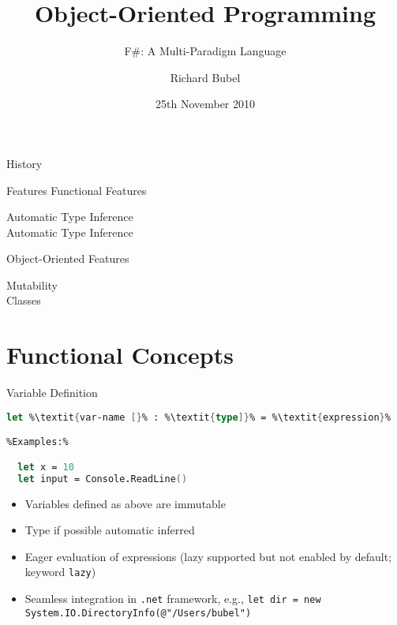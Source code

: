 \documentclass{beamer}
\title[]{Object-Oriented Programming}
\subtitle[F\#]{F\#: A Multi-Paradigm Language} %
\author[Richard Bubel] %
{Richard Bubel}
\institute[CTH]{Chalmers University of Technology}
\date{25th November 2010}%
\newcommand{\Blue}[1]{\color{blue}#1\color{black}\xspace}
\begin{document}
\begin{frame}
  \titlepage
\end{frame}

\begin{frame}{History}
\end{frame}

\begin{frame}{Features}
  \Blue{Functional Features}
  \begin{description}
    \item[Automatic Type Inference]
    \item[Automatic Type Inference]
 \end{description}
 
  \Blue{Object-Oriented Features}
  \begin{description}
    \item[Mutability]
    \item[Classes]
 \end{description}

\end{frame}

\section{Functional Concepts}

\begin{frame}[fragile]{Variable Definition}
\begin{lstlisting}[language=FSharp, escapechar=\%]
  let %\textit{var-name [}% : %\textit{type]}% = %\textit{expression}%

%Examples:%

  let x = 10
  let input = Console.ReadLine()

\end{lstlisting}
  
\begin{itemize}
\item Variables defined as above are immutable
\item Type if possible automatic inferred
\item Eager evaluation of expressions (lazy supported but not enabled
  by default; keyword \lstinline!lazy!)
\item Seamless integration in \texttt{.net} framework, e.g.,
  \lstinline!let dir = new System.IO.DirectoryInfo(@"/Users/bubel")!

 
\end{itemize}

\end{frame}
\end{document}
